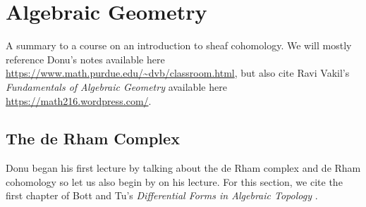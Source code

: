 \chapter{Algebraic Geometry}
A summary to a course on an introduction to sheaf cohomology. We will
mostly reference Donu's notes available here
\url{https://www.math.purdue.edu/~dvb/classroom.html}, but also cite Ravi
Vakil's \emph{Fundamentals of Algebraic Geometry} \cite{vakil} available
here \url{https://math216.wordpress.com/}.

\section{The de Rham Complex}
Donu began his first lecture by talking about the de Rham complex and de
Rham cohomology so let us also begin by on his lecture. For this section,
we cite the first chapter of Bott and Tu's \emph{Differential Forms in
  Algebraic Topology} \cite{bott-tu}.


